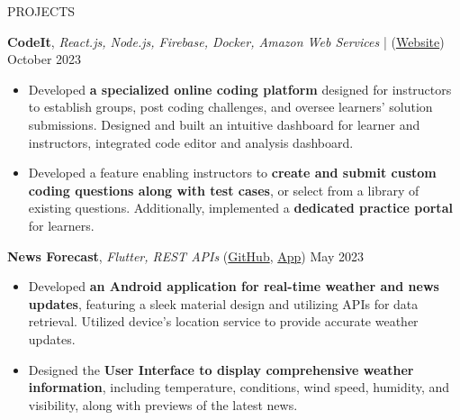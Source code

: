 \documentclass{resume} %
\begin{document}
\begin{rSection}{PROJECTS}
    \vspace{-1.25em}

    \item \textbf{CodeIt}, \textit{React.js, Node.js, Firebase, Docker, Amazon Web Services} | (\href{https://codeit-web.onrender.com/}{Website}) \hfill {October 2023}
    \begin{itemize}
        \setlength\itemsep{-0.6em}
        \item Developed \textbf{a specialized online coding platform} designed for instructors to establish groups, post coding challenges, and oversee learners' solution submissions. Designed and built an intuitive dashboard for learner and instructors, integrated code editor and analysis dashboard.
        \item Developed a feature enabling instructors to \textbf{create and submit custom coding questions along with test cases}, or select from a library of existing questions. Additionally, implemented a \textbf{dedicated practice portal} for learners.
    \end{itemize}

    \item \textbf{News Forecast}, \textit{Flutter, REST APIs} (\href{https://github.com/ninadnaik10/news-forecast}{GitHub}, \href{https://github.com/ninadnaik10/News-Forecast/releases}{App}) \hfill {May 2023}
    \begin{itemize}
        \setlength\itemsep{-0.6em}
        \item Developed \textbf{an Android application for real-time weather and news updates}, featuring a sleek material design and utilizing APIs for data retrieval. Utilized device's location service to provide accurate weather updates.
        \item Designed the \textbf{User Interface to display comprehensive weather information}, including temperature, conditions, wind speed, humidity, and visibility, along with previews of the latest news.
    \end{itemize}


\end{rSection}
\end{document}
